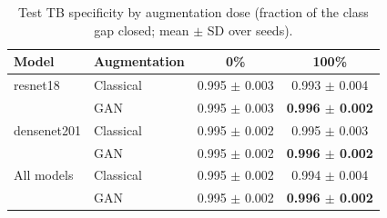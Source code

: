 \begin{table}[htbp]
\centering
\caption{Test TB specificity by augmentation dose (fraction of the class gap closed; mean $\pm$ SD over seeds).}
\label{tab:dose_tb_specificity}
\begin{tabular}{llcc}
\toprule
Model & Augmentation & 0\% & 100\% \\
\midrule
resnet18 & Classical & 0.995 $\pm$ 0.003 & 0.993 $\pm$ 0.004 \\
 & GAN & 0.995 $\pm$ 0.003 & \textbf{0.996 $\pm$ 0.002} \\
\addlinespace
densenet201 & Classical & 0.995 $\pm$ 0.002 & 0.995 $\pm$ 0.003 \\
 & GAN & 0.995 $\pm$ 0.002 & \textbf{0.996 $\pm$ 0.002} \\
\addlinespace
All models & Classical & 0.995 $\pm$ 0.002 & 0.994 $\pm$ 0.004 \\
 & GAN & 0.995 $\pm$ 0.002 & \textbf{0.996 $\pm$ 0.002} \\
\bottomrule
\end{tabular}
\end{table}